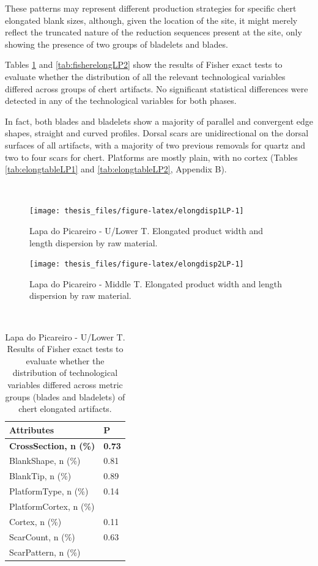 \documentclass[12pt,twoside]{reedthesis}
\begin{document}
These patterns may represent different production strategies for specific chert elongated blank sizes, although, given the location of the site, it might merely reflect the truncated nature of the reduction sequences present at the site, only showing the presence of two groups of bladelets and blades.

Tables \ref{tab:fisherelongLP1} and \ref{tab:fisherelongLP2} show the results of Fisher exact tests to evaluate whether the distribution of all the relevant technological variables differed across groups of chert artifacts. No significant statistical differences were detected in any of the technological variables for both phases.

In fact, both blades and bladelets show a majority of parallel and convergent edge shapes, straight and curved profiles. Dorsal scars are unidirectional on the dorsal surfaces of all artifacts, with a majority of two previous removals for quartz and two to four scars for chert. Platforms are mostly plain, with no cortex (Tables \ref{tab:elongtableLP1} and \ref{tab:elongtableLP2}, Appendix B).

~
\begin{figure}

{\centering \texttt{[image: thesis\_files/figure-latex/elongdisp1LP-1]} 

}

\caption{Lapa do Picareiro - U/Lower T. Elongated product width and length dispersion by raw material.}\label{fig:elongdisp1LP}
\end{figure}
\newpage
\begin{figure}[H]

{\centering \texttt{[image: thesis\_files/figure-latex/elongdisp2LP-1]} 

}

\caption{Lapa do Picareiro - Middle T. Elongated product width and length dispersion by raw material.}\label{fig:elongdisp2LP}
\end{figure}
~

\begingroup\fontsize{9}{11}\selectfont
\begin{longtable}[t]{ll}
\caption{\label{tab:fisherelongLP1}Lapa do Picareiro - U/Lower T. Results of Fisher exact tests to evaluate whether the distribution of technological variables differed across metric groups (blades and bladelets) of chert elongated artifacts.}\\
\toprule
Attributes & P\\
\midrule
\textbf{CrossSection, n (\%)} & \textbf{0.73}\\
BlankShape, n (\%) & 0.81\\
BlankTip, n (\%) & 0.89\\
PlatformType, n (\%) & 0.14\\
PlatformCortex, n (\%) & \\
\addlinespace
Cortex, n (\%) & 0.11\\
ScarCount, n (\%) & 0.63\\
ScarPattern, n (\%) & \\
\bottomrule
\end{longtable}
\endgroup{}
\end{document}
